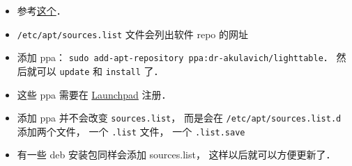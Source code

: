 
\begin{issues}
\issueDraft
\end{issues}


\begin{itemize}
\item 参考\href{https://itsfoss.com/ppa-guide/}{这个}．
\item \verb|/etc/apt/sources.list| 文件会列出软件 repo 的网址
\item 添加 ppa： \verb|sudo add-apt-repository ppa:dr-akulavich/lighttable|． 然后就可以 \verb|update| 和 \verb|install| 了．
\item 这些 ppa 需要在 \href{https://launchpad.net/}{Launchpad} 注册．
\item 添加 ppa 并不会改变 \verb|sources.list|， 而是会在 \verb|/etc/apt/sources.list.d| 添加两个文件， 一个 \verb|.list| 文件， 一个 \verb|.list.save|
\item 有一些 deb 安装包同样会添加 sources.list， 这样以后就可以方便更新了．
\end{itemize}
